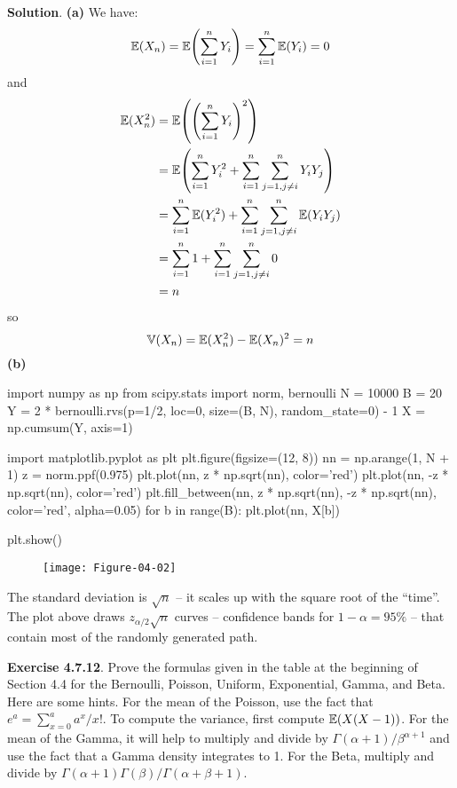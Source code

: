 \textbf{Solution}.
\textbf{(a)} We have:
\[
\EXP(X_{n}) = \EXP\left( \sum_{i=1}^{n} Y_{i} \right) = \sum_{i=1}^{n} \EXP(Y_{i}) = 0
\]
and
\begin{align*}
\EXP(X_{n}^{2}) &= \EXP\left( \left( \sum_{i=1}^{n} Y_{i} \right)^{2} \right) \\
&= \EXP\left( \sum_{i=1}^{n} Y_{i}^{2} + \sum_{i=1}^{n} \sum_{j = 1, j \neq i}^{n} Y_{i} Y_{j} \right) \\
&= \sum_{i=1}^{n} \EXP(Y_{i}^{2}) + \sum_{i=1}^{n} \sum_{j = 1, j \neq i}^{n} \EXP(Y_{i} Y_{j}) \\
&= \sum_{i=1}^{n} 1 + \sum_{i=1}^{n} \sum_{j = 1, j \neq i}^{n} 0 \\
&= n
\end{align*}
so
\[
\operatorname{\mathbb{V}}(X_{n}) = \operatorname{\mathbb{E}}(X_{n}^{2}) - \operatorname{\mathbb{E}}(X_{n})^{2} = n
\]
\textbf{(b)}

\begin{python}
import numpy as np
from scipy.stats import norm, bernoulli
N = 10000
B = 20
Y = 2 * bernoulli.rvs(p=1/2, loc=0, size=(B, N), random_state=0) - 1
X = np.cumsum(Y, axis=1)
\end{python}

\begin{python}
import matplotlib.pyplot as plt
plt.figure(figsize=(12, 8))
nn = np.arange(1, N + 1)
z = norm.ppf(0.975)
plt.plot(nn, z * np.sqrt(nn), color='red')
plt.plot(nn, -z * np.sqrt(nn), color='red')
plt.fill_between(nn, z * np.sqrt(nn), -z * np.sqrt(nn), color='red', alpha=0.05)
for b in range(B):
    plt.plot(nn, X[b])
    
plt.show()
\end{python}

\begin{figure}[H]
\centering
\texttt{[image: Figure-04-02]}
\end{figure}

The standard deviation is \(\sqrt{n}\) -- it scales up with the square
root of the ``time''. The plot above draws \(z_{\alpha / 2} \sqrt{n}\)
curves -- confidence bands for \(1 - \alpha = 95\%\) -- that contain
most of the randomly generated path.

\textbf{Exercise 4.7.12}. Prove the formulas given in the table at the
beginning of Section 4.4 for the Bernoulli, Poisson, Uniform,
Exponential, Gamma, and Beta. Here are some hints. For the mean of the
Poisson, use the fact that \(e^{a} = \sum_{x=0}^{a} a^x / x!\). To compute
the variance, first compute \(\operatorname{\mathbb{E}}(X(X - 1))\). For the mean of
the Gamma, it will help to multiply and divide by
\(\Gamma(\alpha + 1) / \beta^{\alpha + 1}\) and use the fact that a
Gamma density integrates to 1. For the Beta, multiply and divide by
\(\Gamma(\alpha + 1) \Gamma(\beta) / \Gamma(\alpha + \beta + 1)\).

